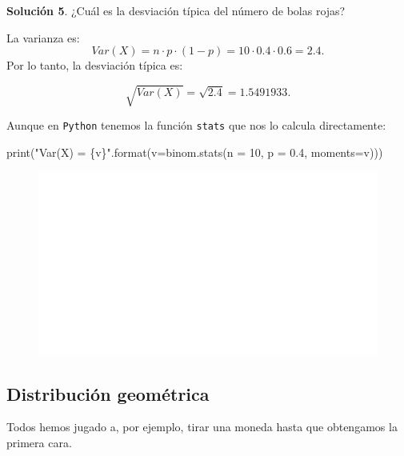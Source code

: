 \documentclass[
  letterpaper,
  DIV=11,
  numbers=noendperiod]{scrreprt}
\newenvironment{Shaded}{\begin{snugshade}}{\end{snugshade}}
\newcommand{\BuiltInTok}[1]{\textcolor[rgb]{0.00,0.23,0.31}{#1}}
\newcommand{\DecValTok}[1]{\textcolor[rgb]{0.68,0.00,0.00}{#1}}
\newcommand{\FloatTok}[1]{\textcolor[rgb]{0.68,0.00,0.00}{#1}}
\newcommand{\NormalTok}[1]{\textcolor[rgb]{0.00,0.23,0.31}{#1}}
\newcommand{\OperatorTok}[1]{\textcolor[rgb]{0.37,0.37,0.37}{#1}}
\newcommand{\SpecialCharTok}[1]{\textcolor[rgb]{0.37,0.37,0.37}{#1}}
\newcommand{\StringTok}[1]{\textcolor[rgb]{0.13,0.47,0.30}{#1}}
\begin{document}
\textbf{Solución 5}. ¿Cuál es la desviación típica del número de bolas
rojas?

La varianza es: \[
Var(X)=n\cdot p \cdot(1-p)=10\cdot 0.4\cdot 0.6=2.4.
\] Por lo tanto, la desviación típica es:

\[\sqrt{Var(X)}=\sqrt{2.4}= 1.5491933.\]

Aunque en \texttt{Python} tenemos la función \texttt{stats} que nos lo
calcula directamente:

\begin{Shaded}
\begin{Highlighting}[]
\BuiltInTok{print}\NormalTok{(}\StringTok{"Var(X) = }\SpecialCharTok{\{v\}}\StringTok{"}\NormalTok{.}\BuiltInTok{format}\NormalTok{(v}\OperatorTok{=}\NormalTok{binom.stats(n }\OperatorTok{=} \DecValTok{10}\NormalTok{, p }\OperatorTok{=} \FloatTok{0.4}\NormalTok{, moments}\OperatorTok{=}\StringTok{\textquotesingle{}v\textquotesingle{}}\NormalTok{)))}
\end{Highlighting}
\end{Shaded}

\begin{figure}[H]

{\centering \includegraphics{3_files/figure-pdf/unnamed-chunk-21-3.pdf}

}

\end{figure}

\hypertarget{distribuciuxf3n-geomuxe9trica}{%
\subsection{Distribución
geométrica}\label{distribuciuxf3n-geomuxe9trica}}

Todos hemos jugado a, por ejemplo, tirar una moneda hasta que obtengamos
la primera cara.
\end{document}
